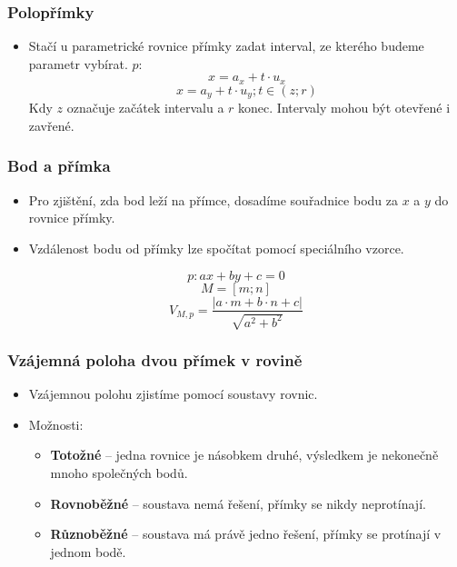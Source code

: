 \subsubsection{Polopřímky}

\begin{itemize}
    \item Stačí u parametrické rovnice přímky zadat interval, ze kterého budeme parametr vybírat.
$p:$
$$
    x=a_x+t\cdot u_x
$$
$$
    x=a_y+t\cdot u_y; t \in (z;r)
$$
Kdy $z$ označuje začátek intervalu a $r$ konec. Intervaly mohou být otevřené i zavřené.
\end{itemize}

\subsubsection*{Bod a přímka}

\begin{itemize}
    \item Pro zjištění, zda bod leží na přímce, dosadíme souřadnice bodu za $x$ a $y$ do rovnice přímky.
    \item Vzdálenost bodu od přímky lze spočítat pomocí speciálního vzorce.
\end{itemize}
$$
    p: ax+by+c=0
$$
$$
    M=[m;n]
$$
$$
    V_{M,p}=\frac{|a\cdot m+b \cdot n + c|}{\sqrt{a^2+b^2}}
$$

\subsubsection{Vzájemná poloha dvou přímek v rovině}
\begin{itemize}
    \item Vzájemnou polohu zjistíme pomocí soustavy rovnic.
    \item Možnosti:
    \begin{itemize}
        \item \textbf{Totožné} – jedna rovnice je násobkem druhé, výsledkem je nekonečně mnoho společných bodů.
        \item \textbf{Rovnoběžné} – soustava nemá řešení, přímky se nikdy neprotínají.
        \item \textbf{Různoběžné} – soustava má právě jedno řešení, přímky se protínají v jednom bodě.
    \end{itemize}
\end{itemize}
